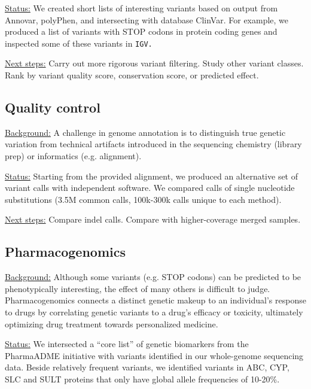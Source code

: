 \documentclass[a4paper,11pt]{TKnotes}
\newcommand{\background}{\vspace*{0.3cm}\noindent\uline{Background:} }
\newcommand{\status}{\vspace*{0.3cm}\noindent\uline{Status:} }
\newcommand{\nextsteps}{\vspace*{0.3cm}\noindent\uline{Next steps:} }
\begin{document}
\status We created short lists of interesting variants based on output from Annovar, polyPhen, and intersecting with database ClinVar. For example, we produced a list of variants with STOP codons in protein coding genes and inspected some of these variants in {\tt IGV.}

\nextsteps Carry out more rigorous variant filtering. Study other variant classes. Rank by variant quality score,  conservation score, or predicted effect.




\vspace*{0.5cm}
\subsection{Quality control}

\background A challenge in genome annotation is to distinguish true genetic variation from technical artifacts introduced in the sequencing chemistry (library prep) or informatics (e.g. alignment). 

\status Starting from the provided alignment, we produced an alternative set of variant calls with independent software. We compared calls of single nucleotide substitutions (3.5M common calls, 100k-300k calls unique to each method).

\nextsteps Compare indel calls. Compare with higher-coverage merged samples.




\vspace*{0.5cm}
\subsection{Pharmacogenomics}

\background Although some variants (e.g. STOP codons) can be predicted to be phenotypically interesting, the effect of many others is difficult to judge. Pharmacogenomics connects a distinct genetic makeup to an individual’s response to drugs by correlating genetic variants to a drug’s efficacy or toxicity, ultimately optimizing drug treatment towards personalized medicine.

\status We intersected a “core list” of genetic biomarkers from the PharmaADME initiative with variants identified in our whole-genome sequencing data. Beside relatively frequent variants, we identified variants in ABC, CYP, SLC and SULT proteins that only have global allele frequencies of 10-20\%.
\end{document}

